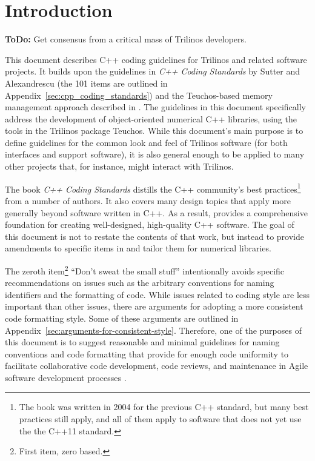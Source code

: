 %
\section{Introduction}
%

{}\textbf{ToDo:} Get consensus from a critical mass of Trilinos
developers.

This document describes C++ coding guidelines for Trilinos and related
software projects.  It builds upon the guidelines in \emph{C++ Coding
  Standards} by Sutter and Alexandrescu {}\cite{C++CodingStandards05}
(the 101 items are outlined in
Appendix~\ref{sec:cpp_coding_standards}) and the Teuchos-based memory
management approach described in
{}\cite{TeuchosMemoryManagementGuide}.  The guidelines in this
document specifically address the development of object-oriented
numerical C++ libraries, using the tools in the Trilinos package
Teuchos.  While this document's main purpose is to define guidelines
for the common look and feel of Trilinos software (for both interfaces
and support software), it is also general enough to be applied to many
other projects that, for instance, might interact with Trilinos.

The book \emph{C++ Coding Standards} {}\cite{C++CodingStandards05}
distills the C++ community's best practices\footnote{The book was
  written in 2004 for the previous C++ standard, but many best
  practices still apply, and all of them apply to software that does
  not yet use the the C++11 standard.} from a number of authors. It
also covers many design topics that apply more generally beyond
software written in C++.  As a result, {}\cite{C++CodingStandards05}
provides a comprehensive foundation for creating well-designed,
high-quality C++ software.  The goal of this document is not to
restate the contents of that work, but instead to provide amendments
to specific items in {}\cite{C++CodingStandards05} and tailor them for
numerical libraries.  

The zeroth item\footnote{First item, zero based.} ``Don't sweat the
small stuff'' intentionally avoids specific recommendations on issues
such as the arbitrary conventions for naming identifiers and the
formatting of code.  While issues related to coding style are less
important than other issues, there are arguments for adopting a more
consistent code formatting style.  Some of these arguments are
outlined in Appendix~\ref{sec:arguments-for-consistent-style}.
Therefore, one of the purposes of this document is to suggest
reasonable and minimal guidelines for naming conventions and code
formatting that provide for enough code uniformity to facilitate
collaborative code development, code reviews, and maintenance in Agile
software development processes
{}\cite{ExtremeProgrammingExplained2nd04}.

